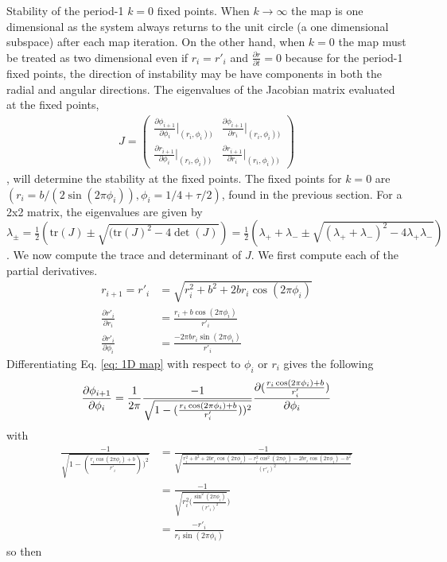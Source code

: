 Stability of the period-1 $k=0$ fixed points. 
When $k\rightarrow\infty$ the map is one dimensional as the system always returns to the unit circle (a one dimensional subspace) after each map iteration. On the other hand, when $k=0$ the map must be treated as two dimensional even if $r_i=r'_i$ and $\frac{\partial r}{\partial t} = 0$ because for the period-1 fixed points, the direction of instability may be have components in both the radial and angular directions. The eigenvalues of the Jacobian matrix evaluated at the fixed points,
\begin{gather*}
J=
\begin{pmatrix}
   \frac{\partial \phi_{i+1}}{\partial \phi_i} |_{(r_i,\phi_i))} & \frac{\partial \phi_{i+1}}{\partial r_i} |_{(r_i,\phi_i))} \\ 
\frac{\partial r_{i+1}}{\partial \phi_i} |_{(r_i,\phi_i))}& \frac{\partial r_{i+1}}{\partial r_i} |_{(r_i,\phi_i))}
\end{pmatrix}
\end{gather*}, will determine the stability at the fixed points. The fixed points for $k=0$ are $(r_i = b/(2\sin(2\pi\phi_i)),\phi_i=1/4+\tau/2)$, found in the previous section. For a 2x2 matrix, the eigenvalues are given by $\lambda_\pm=\frac{1}{2}(\text{tr}(J)\pm \sqrt{(\text{tr}(J)^2-4\det(J)})=\frac{1}{2}(\lambda_++\lambda_-\pm\sqrt{(\lambda_++\lambda_-)^2-4\lambda_+\lambda_-})$. We now compute the trace and determinant of $J$. We first compute each of the partial derivatives.
\begin{align*}
   r_{i+1} = r'_i & = \sqrt{r^2_i+b^2+2br_i\cos(2\pi\phi_i)}\\ 
   \frac{\partial r'_i}{\partial r_i} & = \frac{r_i+b\cos(2\pi\phi_i)}{r'_i}\\
   \frac{\partial r'_i}{\partial \phi_i} & = \frac{-2\pi br_i \sin(2\pi\phi_i)}{r'_i}
\end{align*} 
Differentiating Eq. \ref{eq: 1D map} with respect to $\phi_i$ or $r_i$ gives the following 
\begin{equation*}
   \frac{\partial \phi_{i+1}}{\partial \phi_i}  = \frac{1}{2\pi}\frac{-1}{\sqrt{1-(\frac{r_i\cos(2\pi\phi_i)+b}{r'_i}))^2}}\frac{\partial (\frac{r_i\cos(2\pi\phi_i)+b}{r'_i})}{\partial \phi_i}\\
\end{equation*} with
\begin{align*}
   \frac{-1}{\sqrt{1-(\frac{r_i\cos(2\pi\phi_i)+b}{r'_i}))^2}} & = \frac{-1}{\sqrt{\frac{r_i^2+b^2+2br_i\cos(2\pi\phi_i)-r_i^2\cos^2(2\pi\phi_i)-2br_i\cos(2\pi\phi_i)-b^2}{(r'_i)^2}}}\\
   & = \frac{-1}{\sqrt{r_i^2(\frac{\sin^2(2\pi\phi_i)}{(r'_i)^2}})}\\
   & = \frac{-r'_i}{r_i\sin(2\pi\phi_i)}
\end{align*} so then
